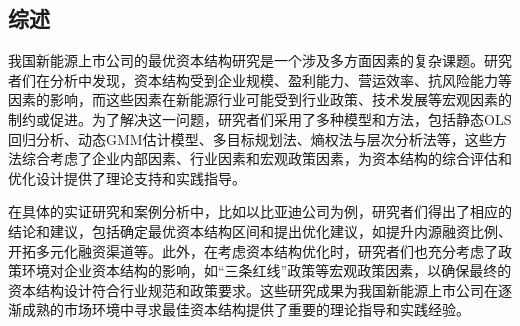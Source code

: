 \subsection{综述}
我国新能源上市公司的最优资本结构研究是一个涉及多方面因素的复杂课题。研究者们在分析中发现，资本结构受到企业规模、盈利能力、营运效率、抗风险能力等因素的影响，而这些因素在新能源行业可能受到行业政策、技术发展等宏观因素的制约或促进。为了解决这一问题，研究者们采用了多种模型和方法，包括静态OLS回归分析、动态GMM估计模型、多目标规划法、熵权法与层次分析法等，这些方法综合考虑了企业内部因素、行业因素和宏观政策因素，为资本结构的综合评估和优化设计提供了理论支持和实践指导。

在具体的实证研究和案例分析中，比如以比亚迪公司为例，研究者们得出了相应的结论和建议，包括确定最优资本结构区间和提出优化建议，如提升内源融资比例、开拓多元化融资渠道等。此外，在考虑资本结构优化时，研究者们也充分考虑了政策环境对企业资本结构的影响，如“三条红线”政策等宏观政策因素，以确保最终的资本结构设计符合行业规范和政策要求。这些研究成果为我国新能源上市公司在逐渐成熟的市场环境中寻求最佳资本结构提供了重要的理论指导和实践经验。
